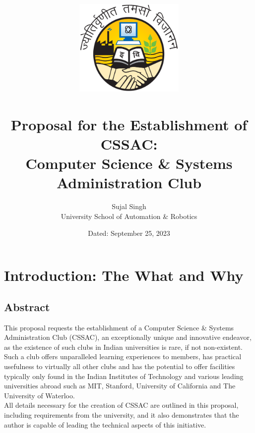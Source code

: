 \documentclass[a4paper,11pt,twocolumn,oneside]{book}
\title{
    \includegraphics[width=150pt]{./images/ipu}
    \\
    \textbf{\\Proposal for the Establishment of CSSAC: \\ Computer Science \& Systems Administration Club}
}
\author{Sujal Singh \\ University School of Automation \& Robotics}
\date{Dated: September 25, 2023}
\begin{document}
    \maketitle
    \tableofcontents


    \chapter{Introduction: The What and Why}\label{ch:introduction}


    \section{Abstract}\label{sec:abstract}
    This proposal requests the establishment of a Computer Science \& Systems Administration Club (CSSAC), an
    exceptionally unique and innovative endeavor, as the existence of such clubs in Indian universities is rare, if not
    non-existent.
    Such a club offers unparalleled learning experiences to members, has practical usefulness to virtually all other
    clubs and has the potential to offer facilities typically only found in the Indian Institutes of Technology and
    various leading universities abroad such as MIT, Stanford, University of California and The University of Waterloo.
    \\
    All details necessary for the creation of CSSAC are outlined in this proposal, including requirements from the
    university, and it also demonstrates that the author is capable of leading the technical aspects of this initiative.


\end{document}
